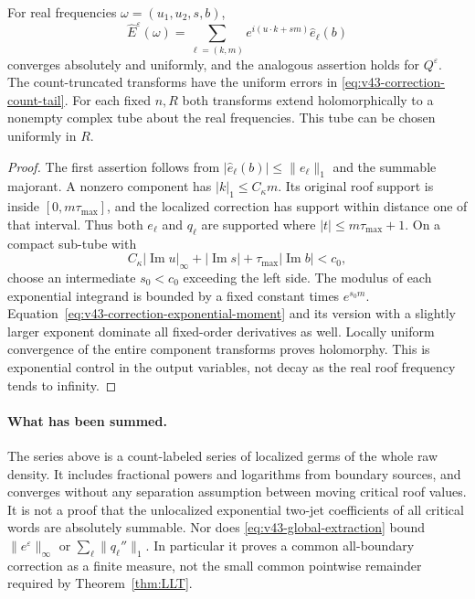 \begin{corollary}
\label{cor:v43-correction-transform}
For real frequencies $\omega=(u_1,u_2,s,b)$,
\[
 \widehat E^\varepsilon(\omega)
  =\sum_{\ell=(k,m)}e^{i(u\cdot k+sm)}\widehat e_\ell(b)
\]
converges absolutely and uniformly, and the analogous assertion holds
for $Q^\varepsilon$. The count-truncated transforms have the uniform
errors in \eqref{eq:v43-correction-count-tail}. For each fixed $n,R$
both transforms extend holomorphically to a nonempty complex tube
about the real frequencies. This tube can be chosen uniformly in $R$.
\end{corollary}
\begin{proof}
The first assertion follows from
$|\widehat e_\ell(b)|\le\|e_\ell\|_1$ and the summable majorant.
A nonzero component has $|k|_1\le C_\kappa m$. Its original roof
support is inside $[0,m\tau_{\max}]$, and the localized correction
has support within distance one of that interval. Thus both $e_\ell$
and $q_\ell$ are supported where $|t|\le m\tau_{\max}+1$.
On a compact sub-tube with
\[
 C_\kappa|\operatorname{Im}u|_\infty
 +|\operatorname{Im}s|+\tau_{\max}|\operatorname{Im}b|<c_0,
\]
choose an intermediate $s_0<c_0$ exceeding the left side. The modulus
of each exponential integrand is bounded by a fixed constant times
$e^{s_0m}$. Equation~\eqref{eq:v43-correction-exponential-moment}
and its version with a slightly larger exponent dominate all
fixed-order derivatives as well. Locally uniform convergence of the
entire component transforms proves holomorphy. This is exponential
control in the output variables, not decay as the real roof frequency
tends to infinity.
\end{proof}

\paragraph{What has been summed.}
The series above is a count-labeled series of localized germs of the
whole raw density. It includes fractional powers and logarithms from
boundary sources, and converges without any separation assumption
between moving critical roof values. It is not a proof that the
unlocalized exponential two-jet coefficients of all critical words
are absolutely summable. Nor does \eqref{eq:v43-global-extraction}
bound $\|e^\varepsilon\|_\infty$ or
$\sum_\ell\|q_\ell''\|_1$. In particular it proves a common
all-boundary correction as a finite measure, not the small common
pointwise remainder required by Theorem~\ref{thm:LLT}.
